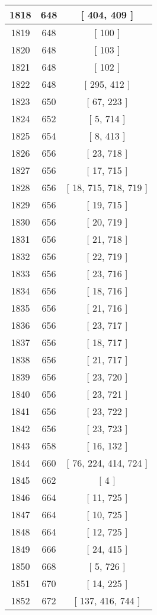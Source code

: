 \begin{center}
\begin{longtable}[H]{|| c c c ||}
\hline
1818 & 648 & [ 404, 409 ] \\ 
\hline
1819 & 648 & [ 100 ] \\ 
\hline
1820 & 648 & [ 103 ] \\ 
\hline
1821 & 648 & [ 102 ] \\ 
\hline
1822 & 648 & [ 295, 412 ] \\ 
\hline
1823 & 650 & [ 67, 223 ] \\ 
\hline
1824 & 652 & [ 5, 714 ] \\ 
\hline
1825 & 654 & [ 8, 413 ] \\ 
\hline
1826 & 656 & [ 23, 718 ] \\ 
\hline
1827 & 656 & [ 17, 715 ] \\ 
\hline
1828 & 656 & [ 18, 715, 718, 719 ] \\ 
\hline
1829 & 656 & [ 19, 715 ] \\ 
\hline
1830 & 656 & [ 20, 719 ] \\ 
\hline
1831 & 656 & [ 21, 718 ] \\ 
\hline
1832 & 656 & [ 22, 719 ] \\ 
\hline
1833 & 656 & [ 23, 716 ] \\ 
\hline
1834 & 656 & [ 18, 716 ] \\ 
\hline
1835 & 656 & [ 21, 716 ] \\ 
\hline
1836 & 656 & [ 23, 717 ] \\ 
\hline
1837 & 656 & [ 18, 717 ] \\ 
\hline
1838 & 656 & [ 21, 717 ] \\ 
\hline
1839 & 656 & [ 23, 720 ] \\ 
\hline
1840 & 656 & [ 23, 721 ] \\ 
\hline
1841 & 656 & [ 23, 722 ] \\ 
\hline
1842 & 656 & [ 23, 723 ] \\ 
\hline
1843 & 658 & [ 16, 132 ] \\ 
\hline
1844 & 660 & [ 76, 224, 414, 724 ] \\ 
\hline
1845 & 662 & [ 4 ] \\ 
\hline
1846 & 664 & [ 11, 725 ] \\ 
\hline
1847 & 664 & [ 10, 725 ] \\ 
\hline
1848 & 664 & [ 12, 725 ] \\ 
\hline
1849 & 666 & [ 24, 415 ] \\ 
\hline
1850 & 668 & [ 5, 726 ] \\ 
\hline
1851 & 670 & [ 14, 225 ] \\ 
\hline
1852 & 672 & [ 137, 416, 744 ] \\ 

\end{longtable}
\end{center}

